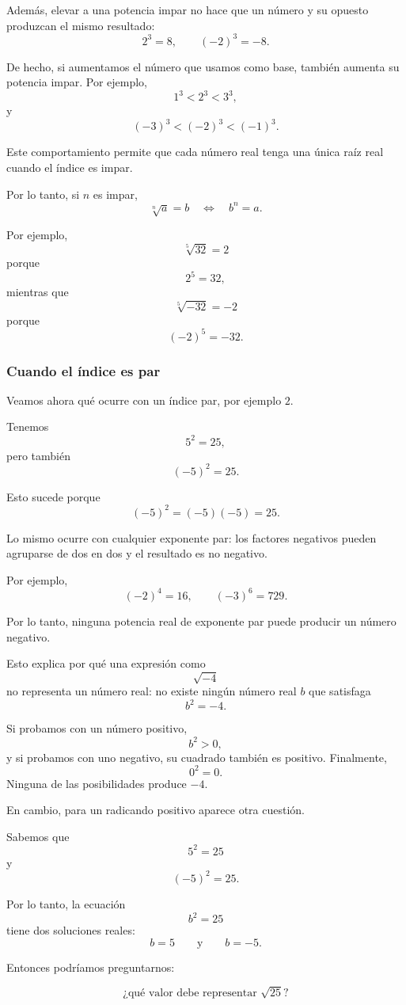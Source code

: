 Además, elevar a una potencia impar no hace que un número y su opuesto produzcan el mismo resultado:
\[
2^3=8,
\qquad
(-2)^3=-8.
\]

De hecho, si aumentamos el número que usamos como base, también aumenta su potencia impar. Por ejemplo,
\[
1^3<2^3<3^3,
\]
y
\[
(-3)^3<(-2)^3<(-1)^3.
\]

Este comportamiento permite que cada número real tenga una única raíz real cuando el índice es impar.

Por lo tanto, si \(n\) es impar,
\[
\sqrt[n]{a}=b
\quad\Longleftrightarrow\quad
b^n=a.
\]

Por ejemplo,
\[
\sqrt[5]{32}=2
\]
porque
\[
2^5=32,
\]
mientras que
\[
\sqrt[5]{-32}=-2
\]
porque
\[
(-2)^5=-32.
\]

\subsubsection{Cuando el índice es par}

Veamos ahora qué ocurre con un índice par, por ejemplo \(2\).

Tenemos
\[
5^2=25,
\]
pero también
\[
(-5)^2=25.
\]

Esto sucede porque
\[
(-5)^2=(-5)(-5)=25.
\]

Lo mismo ocurre con cualquier exponente par: los factores negativos pueden agruparse de dos en dos y el resultado es no negativo.

Por ejemplo,
\[
(-2)^4=16,
\qquad
(-3)^6=729.
\]

Por lo tanto, ninguna potencia real de exponente par puede producir un número negativo.

Esto explica por qué una expresión como
\[
\sqrt{-4}
\]
no representa un número real: no existe ningún número real \(b\) que satisfaga
\[
b^2=-4.
\]

Si probamos con un número positivo,
\[
b^2>0,
\]
y si probamos con uno negativo, su cuadrado también es positivo. Finalmente,
\[
0^2=0.
\]
Ninguna de las posibilidades produce \(-4\).

En cambio, para un radicando positivo aparece otra cuestión.

Sabemos que
\[
5^2=25
\]
y
\[
(-5)^2=25.
\]

Por lo tanto, la ecuación
\[
b^2=25
\]
tiene dos soluciones reales:
\[
b=5
\qquad\text{y}\qquad
b=-5.
\]

Entonces podríamos preguntarnos:

\[
\text{¿qué valor debe representar \(\sqrt{25}\)?}
\]

